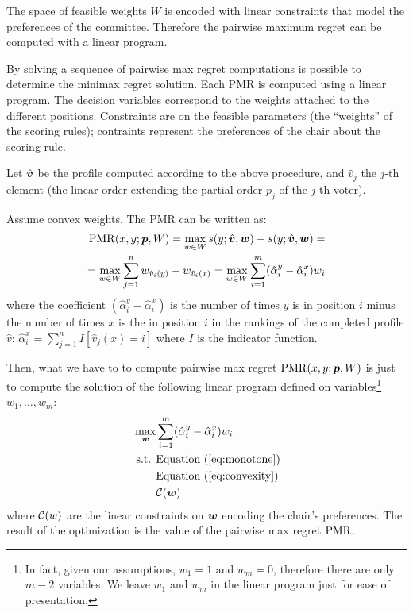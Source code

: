 The space of feasible weights $W$ is encoded with linear constraints that model the preferences of the committee.
Therefore the pairwise maximum regret can be computed with a linear program.


By solving a sequence of pairwise max regret computations is possible to determine the minimax regret solution.
Each PMR is computed using a linear program.
The decision variables correspond to the weights attached to the different positions.
Constraints are on the feasible parameters (the ``weights'' of the scoring rules); contraints represent the preferences of the chair about the scoring rule.

Let $\hat{\bm{v}}$ be the profile computed according to the above procedure, and  $\hat{v}_j$ the $j$-th element (the linear order extending the partial order $p_j$ of the $j$-th voter).
\begin{prop}
Assume convex weights.
The PMR can be written as:
\begin{align} 
\operatorname{PMR}(x,y; {\bm{p}}, W) =  
\max_{w \in W} s(y; \hat{\bm{v}}, \bm{w}) - s(y; \hat{\bm{v}}, \bm{w}) =\\
=\max_{w \in W} \sum_{j=1}^n w_{\hat{v}_i(y)} - w_{\hat{v}_i(x)} =
\max_{w \in W} \sum_{i=1}^m (\hat{\alpha}_{i}^{y} - \hat{\alpha}_{i}^{x}) w_i 
\end{align}
where the coefficient $ (\hat{\alpha}_{i}^{y} - \hat{\alpha}_{i}^{x})$ is the number of times $y$ is in position $i$ minus the number of times $x$ is the in position $i$ in the rankings of the completed profile $\hat{v}$:
$\hat{\alpha}_{i}^{x} = \sum_{j=1}^{n}  I[\hat{v}_{j}(x)=i]$ where $I$ is the indicator function.
\end{prop}
Then, what we have to to compute pairwise max regret $\operatorname{PMR}(x,y; {\bm{p}},W)$ is just to compute the solution of the following linear program defined on variables\footnote{In fact, given our assumptions, $w_{1}=1$ and $w_{m}=0$, therefore there are only $m-2$ variables. We leave $w_{1}$ and $w_{m}$ in the linear program just for ease of presentation.} $w_{1},\ldots,w_{m}$:
\begin{align*}
\max_{\bm{w}} & \sum_{i=1}^m (\hat{\alpha}_{i}^{y} - \hat{\alpha}_{i}^{x}) w_{i}\\
\text{ s.t. } & \text{Equation } (\ref{eq:monotone})\\
& \text{Equation } (\ref{eq:convexity})\\
& \mathcal{C}(\bm{w})
\end{align*}
where $\mathcal{C}(w)$ are the linear constraints on $\bm{w}$ encoding the chair's preferences.
The result of the optimization is the value of the pairwise max regret $\operatorname{PMR}$.

